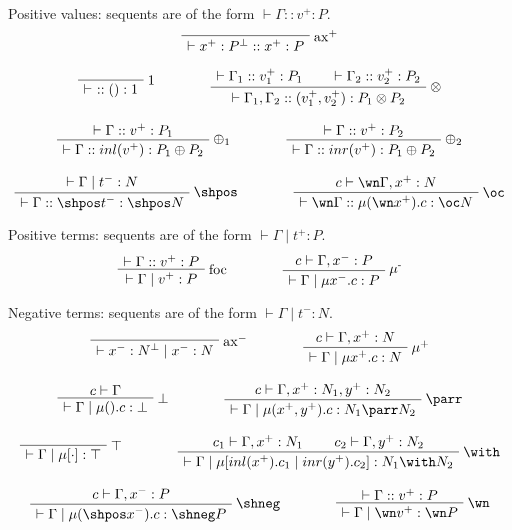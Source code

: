 Positive values: sequents are of the form \(\vdash \Gamma :: v^+ : P\).
\begin{gather*}
\LabelRule{\rulename{ax}^+}
\NulRule{\vdash x^+:P\orth :: x^+: P}
\DisplayProof
\\[2ex]
\LabelRule{1}
\NulRule{\vdash \ :: () : 1}
\DisplayProof
\qquad\qquad
\AxRule{\vdash \Gamma_1 :: v_1^+ : P_1}
\AxRule{\vdash \Gamma_2 :: v_2^+ : P_2}
\LabelRule{\rulename{\otimes}}
\BinRule{\vdash\Gamma_1, \Gamma_2 :: (v_1^+, v_2^+) : P_1\otimes P_2}
\DisplayProof
\\[2ex]
\AxRule{\vdash \Gamma :: v^+ : P_1}
\LabelRule{\rulename{\oplus_1}}
\UnaRule{\vdash\Gamma :: inl(v^+) : P_1\oplus P_2}
\DisplayProof
\qquad\qquad
\AxRule{\vdash \Gamma :: v^+ : P_2}
\LabelRule{\rulename{\oplus_2}}
\UnaRule{\vdash\Gamma :: inr(v^+) : P_1\oplus P_2}
\DisplayProof
\\[2ex]
\AxRule{\vdash \Gamma \mid t^- : N}
\LabelRule{\shpos}
\UnaRule{\vdash\Gamma :: \shpos t^- : \shpos N}
\DisplayProof
\qquad\qquad
\AxRule{c \vdash \wn\Gamma, x^+ : N}
\LabelRule{\oc}
\UnaRule{\vdash\wn\Gamma :: \mu(\wn x^+).c : \oc N}
\DisplayProof
\end{gather*}

Positive terms: sequents are of the form \(\vdash\Gamma\mid t^+:P\).
\begin{equation*}
\AxRule{\vdash \Gamma :: v^+ : P}
\LabelRule{\rulename{foc}}
\UnaRule{\vdash\Gamma \mid v^+ : P}
\DisplayProof
\qquad\qquad
\AxRule{c \vdash \Gamma, x^- : P}
\LabelRule{\rulename{\mu^-}}
\UnaRule{\vdash\Gamma \mid\mu x^-.c : P}
\DisplayProof
\end{equation*}

Negative terms: sequents are of the form \(\vdash\Gamma\mid t^-:N\).
\begin{gather*}
\LabelRule{\rulename{ax}^-}
\NulRule{\vdash x^-:N\orth \mid x^-: N}
\DisplayProof
\qquad\qquad
\AxRule{c\vdash \Gamma, x^+: N}
\LabelRule{\mu^+}
\UnaRule{\vdash\Gamma \mid \mu x^+.c : N}
\DisplayProof
\\[2ex]
\AxRule{c \vdash \Gamma}
\LabelRule{\bot}
\UnaRule{\vdash \Gamma \mid \mu().c : \bot}
\DisplayProof
\qquad\qquad
\AxRule{c\vdash \Gamma, x^+: N_1, y^+: N_2}
\LabelRule{\rulename{\parr}}
\UnaRule{\vdash\Gamma \mid \mu(x^+, y^+).c : N_1 \parr N_2}
\DisplayProof
\\[2ex]
\LabelRule{\rulename{\top}}
\NulRule{\vdash \Gamma \mid \mu[\cdot] : \top}
\DisplayProof
\qquad\qquad
\AxRule{c_1\vdash \Gamma, x^+:N_1}
\AxRule{c_2\vdash \Gamma, y^+:N_2}
\LabelRule{\rulename{\with}}
\BinRule{\vdash\Gamma \mid \mu[inl(x^+).c_1 \mid inr(y^+).c_2] : N_1 \with N_2}
\DisplayProof
\\[2ex]
\AxRule{c\vdash \Gamma, x^-: P}
\LabelRule{\shneg}
\UnaRule{\vdash\Gamma \mid \mu(\shpos x^-).c : \shneg P}
\DisplayProof
\qquad\qquad
\AxRule{\vdash \Gamma :: v^+ : P}
\LabelRule{\wn}
\UnaRule{\vdash\Gamma \mid \wn v^+ : \wn P}
\DisplayProof
\end{gather*}

